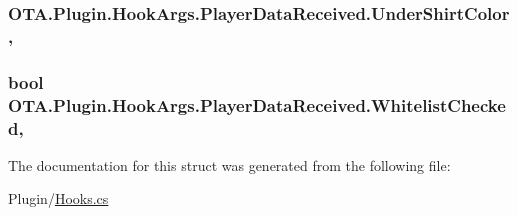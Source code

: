 \subsubsection[{Under\+Shirt\+Color}]{ O\+T\+A.\+Plugin.\+Hook\+Args.\+Player\+Data\+Received.\+Under\+Shirt\+Color\hspace{0.3cm}{\ttfamily [get]}, {\ttfamily [set]}}\label{struct_o_t_a_1_1_plugin_1_1_hook_args_1_1_player_data_received_adf33d8fc5124864cfd7c2efcf51e95b8}
\hypertarget{struct_o_t_a_1_1_plugin_1_1_hook_args_1_1_player_data_received_a06773ca67399ec9cb8e7b4ecd3e98f75}{}
\subsubsection[{Whitelist\+Checked}]{\setlength{\rightskip}{0pt plus 5cm}bool O\+T\+A.\+Plugin.\+Hook\+Args.\+Player\+Data\+Received.\+Whitelist\+Checked\hspace{0.3cm}{\ttfamily [get]}, {\ttfamily [set]}}\label{struct_o_t_a_1_1_plugin_1_1_hook_args_1_1_player_data_received_a06773ca67399ec9cb8e7b4ecd3e98f75}


The documentation for this struct was generated from the following file\+:\begin{DoxyCompactItemize}
\item 
Plugin/\hyperlink{_hooks_8cs}{Hooks.\+cs}\end{DoxyCompactItemize}
